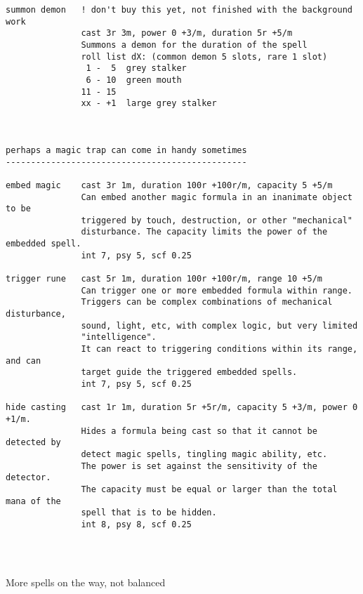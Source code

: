 \begin{verbatim}
summon demon   ! don't buy this yet, not finished with the background work
               cast 3r 3m, power 0 +3/m, duration 5r +5/m
               Summons a demon for the duration of the spell
               roll list dX: (common demon 5 slots, rare 1 slot)
                1 -  5  grey stalker
                6 - 10  green mouth
               11 - 15
               xx - +1  large grey stalker



perhaps a magic trap can come in handy sometimes
------------------------------------------------

embed magic    cast 3r 1m, duration 100r +100r/m, capacity 5 +5/m
               Can embed another magic formula in an inanimate object to be
               triggered by touch, destruction, or other "mechanical"
               disturbance. The capacity limits the power of the embedded spell.
               int 7, psy 5, scf 0.25

trigger rune   cast 5r 1m, duration 100r +100r/m, range 10 +5/m
               Can trigger one or more embedded formula within range.
               Triggers can be complex combinations of mechanical disturbance,
               sound, light, etc, with complex logic, but very limited
               "intelligence".
               It can react to triggering conditions within its range, and can
               target guide the triggered embedded spells.
               int 7, psy 5, scf 0.25

hide casting   cast 1r 1m, duration 5r +5r/m, capacity 5 +3/m, power 0 +1/m.
               Hides a formula being cast so that it cannot be detected by
               detect magic spells, tingling magic ability, etc.
               The power is set against the sensitivity of the detector.
               The capacity must be equal or larger than the total mana of the
               spell that is to be hidden.
               int 8, psy 8, scf 0.25


\end{verbatim} \normalsize



\

More spells on the way, not balanced 

\

